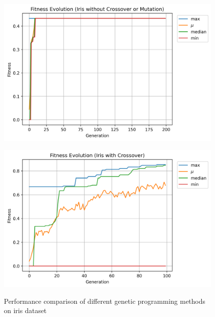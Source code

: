 \documentclass[12pt, final]{dalcsthesis}
\begin{document}
\begin{figure}[b]
	\centering
	\begin{subfloat}{\includegraphics[width=\textwidth]{iris_baseline.png}\label{fig:iris_baseline}}
	\end{subfloat}

	\begin{subfloat}{\includegraphics[width=\textwidth]{iris_crossover.png}\label{fig:iris_crossover}}
	\end{subfloat}

	\caption{Performance comparison of different genetic programming methods on iris dataset}
	\label{fig:iris_comparison}
\end{figure}
\end{document}
